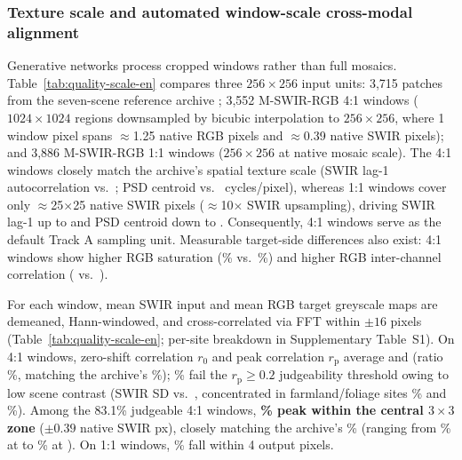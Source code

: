 \documentclass[a4paper,10pt]{article}
\begin{document}
\subsubsection{Texture scale and automated window-scale cross-modal alignment}\label{sec:quality-scale-en}\label{sec:quality-align-en}
Generative networks process cropped windows rather than full mosaics. Table~\ref{tab:quality-scale-en} compares three $256\times256$ input units: 3,715 patches from the seven-scene reference archive \cite{chen2026thesis}; 3,552 M-SWIR-RGB 4:1 windows ($1024\times1024$ regions downsampled by bicubic interpolation to $256\times256$, where 1 window pixel spans $\approx$1.25 native RGB pixels and $\approx$0.39 native SWIR pixels); and 3,886 M-SWIR-RGB 1:1 windows ($256\times256$ at native mosaic scale). The 4:1 windows closely match the archive's spatial texture scale (SWIR lag-1 autocorrelation \ScaleMsLagOne{} vs.\ \ScaleChenLagOne; PSD centroid \ScaleMsPsd{} vs.\ \ScaleChenPsd{} cycles/pixel), whereas 1:1 windows cover only $\approx$25$\times$25 native SWIR pixels ($\approx$10$\times$ SWIR upsampling), driving SWIR lag-1 up to \ScaleNativeLagOne{} and PSD centroid down to \ScaleNativePsd. Consequently, 4:1 windows serve as the default Track A sampling unit. Measurable target-side differences also exist: 4:1 windows show higher RGB saturation (\ScaleMsRgbSat\% vs.\ \ScaleChenRgbSat\%) and higher RGB inter-channel correlation (\ScaleMsRgbChanCorr{} vs.\ \ScaleChenRgbChanCorr).

For each window, mean SWIR input and mean RGB target greyscale maps are demeaned, Hann-windowed, and cross-correlated via FFT within $\pm16$ pixels \cite{reddy1996,guizar2008} (Table~\ref{tab:quality-scale-en}; per-site breakdown in Supplementary Table~S1). On 4:1 windows, zero-shift correlation $r_0$ and peak correlation $r_{\mathrm{p}}$ average \ScaleMsAbCorr{} and \ScaleMsAbPeak{} (ratio \ScaleMsAbRatio\%, matching the archive's \ScaleChenAbRatio\%); \ScaleMsPeakWeakPct\% fail the $r_{\mathrm{p}}\ge 0.2$ judgeability threshold owing to low scene contrast (SWIR SD \ScaleMsWeakStd{} vs.\ \ScaleMsStrongStd, concentrated in farmland/foliage sites \SceneWeakMaxName{} \SceneWeakMax\% and \SceneWeakSecondName{} \SceneWeakSecond\%). Among the 83.1\% judgeable 4:1 windows, \textbf{\ScaleMsPeakWithinOnePxStrong\% peak within the central $3\times3$ zone} ($\pm0.39$ native SWIR px), closely matching the archive's \ScaleChenPeakWithinOnePxStrong\% (ranging from \SceneAlignMin\% at \SceneAlignMinName{} to \SceneAlignMax\% at \SceneAlignMaxName). On 1:1 windows, \ScaleNativePeakWithinFourPx\% fall within 4 output pixels.
\end{document}
